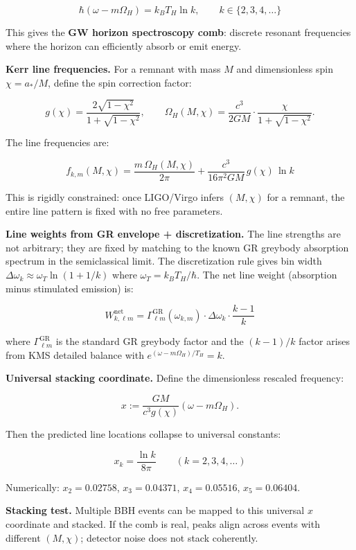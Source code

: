 \documentclass[11pt,a4paper]{article}
\theoremstyle{remark}
\begin{document}
\[
\hbar(\omega - m\Omega_H) = k_B T_H \ln k, \qquad k \in \{2, 3, 4, \ldots\}
\]

This gives the \textbf{GW horizon spectroscopy comb}: discrete resonant frequencies
where the horizon can efficiently absorb or emit energy.

\textbf{Kerr line frequencies.} For a remnant with mass \(M\) and dimensionless spin
\(\chi = a_*/M\), define the spin correction factor:

\[
g(\chi) = \frac{2\sqrt{1-\chi^2}}{1+\sqrt{1-\chi^2}}, \qquad
\Omega_H(M,\chi) = \frac{c^3}{2GM} \cdot \frac{\chi}{1+\sqrt{1-\chi^2}}.
\]

The line frequencies are:

\[
f_{k,m}(M,\chi) = \frac{m \, \Omega_H(M,\chi)}{2\pi} + \frac{c^3}{16\pi^2 GM} \, g(\chi) \, \ln k
\]

This is rigidly constrained: once LIGO/Virgo infers \((M, \chi)\) for a remnant,
the entire line pattern is fixed with no free parameters.

\textbf{Line weights from GR envelope + discretization.} The line strengths are not
arbitrary; they are fixed by matching to the known GR greybody absorption
spectrum in the semiclassical limit. The discretization rule gives bin width
\(\Delta\omega_k \approx \omega_T \ln(1 + 1/k)\) where \(\omega_T = k_B T_H/\hbar\).
The net line weight (absorption minus stimulated emission) is:

\[
W^{\mathrm{net}}_{k,\ell m} = \Gamma^{\mathrm{GR}}_{\ell m}(\omega_{k,m}) \cdot \Delta\omega_k \cdot \frac{k-1}{k}
\]

where \(\Gamma^{\mathrm{GR}}_{\ell m}\) is the standard GR greybody factor and the
\((k-1)/k\) factor arises from KMS detailed balance with \(e^{(\omega-m\Omega_H)/T_H} = k\).

\textbf{Universal stacking coordinate.} Define the dimensionless rescaled frequency:

\[
x := \frac{GM}{c^3 g(\chi)}(\omega - m\Omega_H).
\]

Then the predicted line locations collapse to universal constants:

\[
x_k = \frac{\ln k}{8\pi} \qquad (k = 2, 3, 4, \ldots)
\]

Numerically: \(x_2 = 0.02758\), \(x_3 = 0.04371\), \(x_4 = 0.05516\), \(x_5 = 0.06404\).

\textbf{Stacking test.} Multiple BBH events can be mapped to this universal \(x\)
coordinate and stacked. If the comb is real, peaks align across events with
different \((M, \chi)\); detector noise does not stack coherently.
\end{document}
